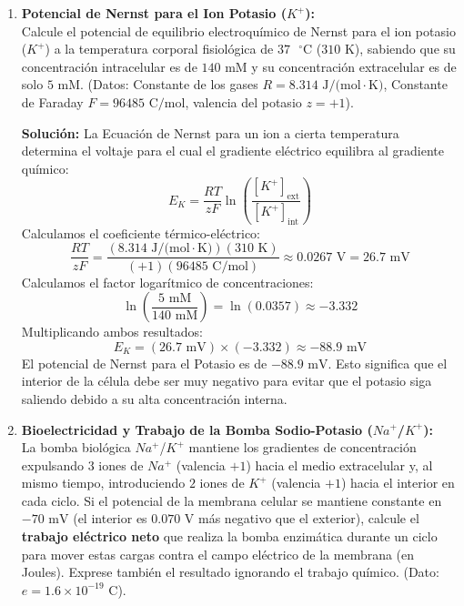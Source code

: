\documentclass[11pt,letterpaper]{article}
\begin{document}
\begin{enumerate}[leftmargin=*]
    \vspace{0.3cm}

    \item \textbf{Potencial de Nernst para el Ion Potasio ($K^+$):}\\
    Calcule el potencial de equilibrio electroquímico de Nernst para el ion potasio ($K^+$) a la temperatura corporal fisiológica de $37 \text{ }^\circ\text{C}$ ($310 \text{ K}$), sabiendo que su concentración intracelular es de $140 \text{ mM}$ y su concentración extracelular es de solo $5 \text{ mM}$. 
    (Datos: Constante de los gases $R = 8.314 \text{ J/(mol}\cdot\text{K)}$, Constante de Faraday $F = 96485 \text{ C/mol}$, valencia del potasio $z = +1$).
    
    \textbf{Solución:}
    La Ecuación de Nernst para un ion a cierta temperatura determina el voltaje para el cual el gradiente eléctrico equilibra al gradiente químico:
    \[
    E_K = \frac{RT}{zF} \ln\left( \frac{[K^+]_{\text{ext}}}{[K^+]_{\text{int}}} \right)
    \]
    Calculamos el coeficiente térmico-eléctrico:
    \[
    \frac{RT}{zF} = \frac{(8.314 \text{ J/(mol}\cdot\text{K)})(310 \text{ K})}{(+1)(96485 \text{ C/mol})} \approx 0.0267 \text{ V} = 26.7 \text{ mV}
    \]
    Calculamos el factor logarítmico de concentraciones:
    \[
    \ln\left( \frac{5 \text{ mM}}{140 \text{ mM}} \right) = \ln(0.0357) \approx -3.332
    \]
    Multiplicando ambos resultados:
    \[
    E_K = (26.7 \text{ mV}) \times (-3.332) \approx -88.9 \text{ mV}
    \]
    El potencial de Nernst para el Potasio es de $-88.9 \text{ mV}$. Esto significa que el interior de la célula debe ser muy negativo para evitar que el potasio siga saliendo debido a su alta concentración interna.

    \vspace{0.3cm}

    \item \textbf{Bioelectricidad y Trabajo de la Bomba Sodio-Potasio ($Na^+$/$K^+$):}\\
    La bomba biológica $Na^+$/$K^+$ mantiene los gradientes de concentración expulsando $3$ iones de $Na^+$ (valencia $+1$) hacia el medio extracelular y, al mismo tiempo, introduciendo $2$ iones de $K^+$ (valencia $+1$) hacia el interior en cada ciclo. Si el potencial de la membrana celular se mantiene constante en $-70 \text{ mV}$ (el interior es $0.070 \text{ V}$ más negativo que el exterior), calcule el \textbf{trabajo eléctrico neto} que realiza la bomba enzimática durante un ciclo para mover estas cargas contra el campo eléctrico de la membrana (en Joules). Exprese también el resultado ignorando el trabajo químico. (Dato: $e = 1.6 \times 10^{-19} \text{ C}$).
    

\end{enumerate}
\end{document}
